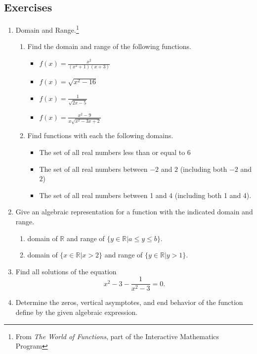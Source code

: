 \documentclass[
]{book}
\providecommand{\tightlist}{%
  \setlength{\itemsep}{0pt}\setlength{\parskip}{0pt}}
\theoremstyle{definition}
\theoremstyle{definition}
\theoremstyle{definition}
\theoremstyle{definition}
\theoremstyle{remark}
\begin{document}
\hypertarget{exercises-36}{%
\subsection{Exercises}\label{exercises-36}}

\begin{enumerate}
\def\labelenumi{\arabic{enumi}.}
\item
  Domain and Range.\footnote{From \emph{The World of Functions}, part of the Interactive Mathematics Program}

  \begin{enumerate}
  \def\labelenumii{\alph{enumii}.}
  \tightlist
  \item
    Find the domain and range of the following functions.

    \begin{itemize}
    \tightlist
    \item
      \(\displaystyle{ f(x) =\frac{x^2}{(x^2+1)(x+3)}}\)
    \item
      \(\displaystyle{f(x)=\sqrt{x^2-16}}\)
    \item
      \(\displaystyle{f(x)=\frac{1}{\sqrt{2x-5}}}\)
    \item
      \(\displaystyle{f(x)= \frac{x^2-9}{x\sqrt{x^2-3x+2}}}\)
    \end{itemize}
  \item
    Find functions with each the following domains.

    \begin{itemize}
    \tightlist
    \item
      The set of all real numbers less than or equal to 6
    \item
      The set of all real numbers between \(-2\) and \(2\) (including both \(-2\) and \(2\))
    \item
      The set of all real numbers between 1 and 4 (including both 1 and 4).
    \end{itemize}
  \end{enumerate}
\item
  Give an algebraic representation for a function with the indicated domain and range.

  \begin{enumerate}
  \def\labelenumii{\alph{enumii}.}
  \tightlist
  \item
    domain of \(\mathbb{R}\) and range of \(\{y\in \mathbb{R}\vert a\leq y \leq b\}\).
  \item
    domain of \(\{x\in \mathbb{R}\vert x>2\}\) and range of \(\{y\in \mathbb{R}\vert y>1\}\).
  \end{enumerate}
\item
  Find all solutions of the equation
  \[x^2-3 - \frac{1}{x^2-3} = 0.\]
\item
  Determine the zeros, vertical asymptotes, and end behavior of the function define by the given algebraic expression.


\end{enumerate}
\end{document}
